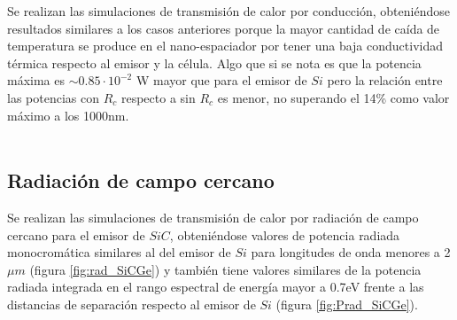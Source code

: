 Se realizan las simulaciones de transmisión de calor por conducción, obteniéndose resultados similares a los casos anteriores porque la mayor cantidad de caída de temperatura se produce en el nano-espaciador por tener una baja conductividad térmica respecto al emisor y la célula. Algo que si se nota es que la potencia máxima es $\sim 0.85\cdot 10^{-2}$ W mayor que para el emisor de $Si$ pero la relación entre las potencias con $R_c$ respecto a sin $R_c$ es menor, no superando el 14\% como valor máximo a los 1000nm.\\\\
\subsection{Radiación de campo cercano}
Se realizan las simulaciones de transmisión de calor por radiación de campo cercano para el emisor de $SiC$, obteniéndose valores de potencia radiada monocromática similares al del emisor de $Si$ para longitudes de onda menores a 2$\mu m$ (figura \ref{fig:rad_SiCGe}) y también tiene valores similares de la potencia radiada integrada en el rango espectral de energía mayor a 0.7eV frente a las distancias de separación respecto al emisor de $Si$ (figura \ref{fig:Prad_SiCGe}).
\graphicspath{ {./figuras/Resultados/radiacion} }
